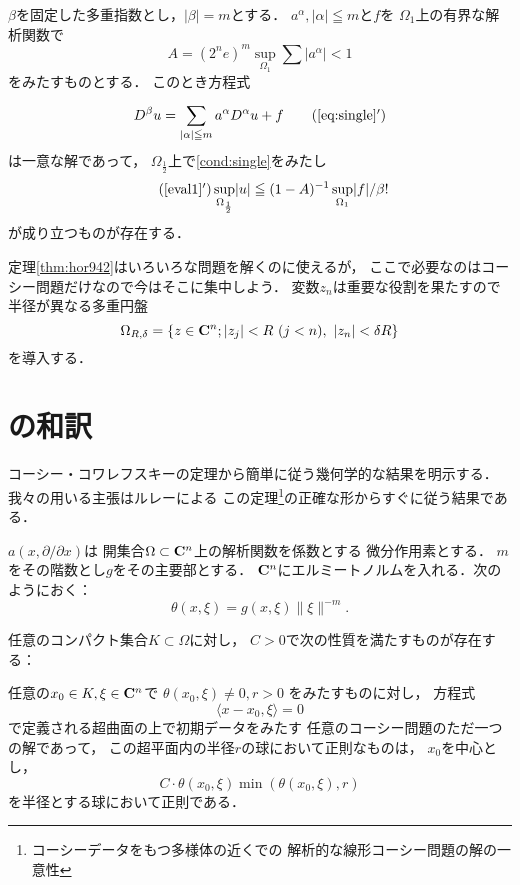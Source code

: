 \begin{THM}\label{thm:hor942}
    \(\beta\)を固定した多重指数とし，\(\lvert\beta\rvert=m\)とする．
    \(a^\alpha, \lvert\alpha\rvert\leqq m\)と\(f\)を
    \(\Omega_1\)上の有界な解析関数で
    \[
        A=(2^ne)^m\sup_{\Omega_1}\sum\lvert a^\alpha\rvert<1
    \]
    をみたすものとする．
    このとき方程式
    \begin{equation}
        D^\beta u=\sum_{\lvert\alpha\rvert\leqq m}^{}a^\alpha D^\alpha u+f\tag{\ref{eq:single}$'$}\label{eq:single-1}
    \end{equation}
    は一意な解であって，
    \(\Omega_{\frac{1}{2}}\)上で\eqref{cond:single}をみたし
    \begin{equation}\tag{\ref{eval1}$'$}\label{eval2}
        \sup_{\Omega_\frac{1}{2}}\lvert u\rvert
        \leqq (1-A)^{-1}
        \sup_{\Omega_1}\lvert f\rvert/\beta!
    \end{equation}
    が成り立つものが存在する．
\end{THM}

定理\ref{thm:hor942}はいろいろな問題を解くのに使えるが，
ここで必要なのはコーシー問題だけなので今はそこに集中しよう．
変数\(z_n\)は重要な役割を果たすので半径が異なる多重円盤
\[
    \Omega_{R,\delta}=\{z\in\cc^n;
    \lvert z_j\rvert<R\ (j<n),\ 
    \lvert z_n\rvert<\delta R\}
\]
を導入する．
\section{\cite{Zer71}の和訳}

コーシー・コワレフスキーの定理から簡単に従う幾何学的な結果を明示する．
我々の用いる主張はルレーによる
この定理\footnote{
    コーシーデータをもつ多様体の近くでの
    解析的な線形コーシー問題の解の一意性
}の正確な形からすぐに従う結果である．

\begin{NTN}
    \(a(x,\partial/\partial x)\)は
    開集合\(\Omega\subset\mathbf{C}^n\)上の解析関数を係数とする
    微分作用素とする．
    \(m\)をその階数とし\(g\)をその主要部とする．
    \(\mathbf{C}^n\)にエルミートノルムを入れる．次のようにおく：
    \[
        \theta(x,\xi)=g(x,\xi)\lVert\xi\rVert^{-m}.
    \]
\end{NTN}

\begin{THM}
    任意のコンパクト集合\(K\subset\Omega\)に対し，
    \(C>0\)で次の性質を満たすものが存在する：
    
    任意の\(x_0\in K,\xi\in\mathbf{C}^n\)で
    \(\theta(x_0,\xi)\ne0, r>0\)
    をみたすものに対し，
    方程式
    \[
        \langle x-x_0,\xi\rangle=0
    \]で定義される超曲面の上で初期データをみたす
    任意のコーシー問題のただ一つの解であって，
    この超平面内の半径\(r\)の球において正則なものは，
    \(x_0\)を中心とし，
    \[
        C\cdot\theta(x_0,\xi)\min\left(\theta(x_0,\xi),r\right)
    \]
    を半径とする球において正則である．
\end{THM}

